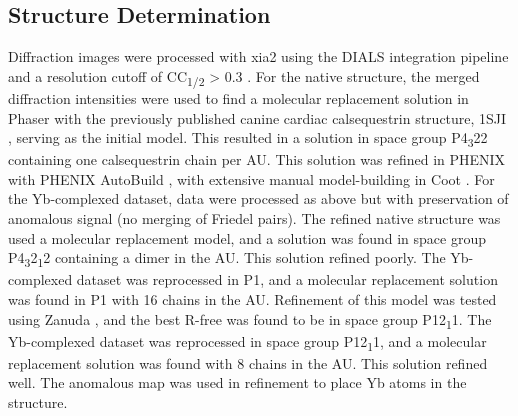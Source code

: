 \subsection*{Structure Determination}
Diffraction images were processed with xia2 using the DIALS integration pipeline and a resolution cutoff of CC\textsubscript{1/2} > 0.3 \supercite{Winter2018-oa,Winter2010-tx,Evans2013-wu,Evans2006-cc,Winn2011-fi}. For the native structure, the merged diffraction intensities were used to find a molecular replacement solution in Phaser \supercite{McCoy2007-rr} with the previously published canine cardiac calsequestrin structure, 1SJI \supercite{Park2004-bu}, serving as the initial model. This resulted in a solution in space group P4\textsubscript{3}22 containing one calsequestrin chain per AU. This solution was refined in PHENIX \supercite{Adams2010-qs} with PHENIX AutoBuild \supercite{Adams2010-qs,Afonine2012-xn,Terwilliger2004-hs,Terwilliger2008-zf,Zwart2005-kc}, with extensive manual model-building in Coot \supercite{Emsley2010-il}. For the Yb-complexed dataset, data were processed as above but with preservation of anomalous signal (no merging of Friedel pairs). The refined native structure was used a molecular replacement model, and a solution was found in space group P4\textsubscript{3}2\textsubscript{1}2 containing a dimer in the AU. This solution refined poorly. The Yb-complexed dataset was reprocessed in P1, and a molecular replacement solution was found in P1 with 16 chains in the AU. Refinement of this model was tested using Zanuda \supercite{Lebedev2014-po}, and the best R-free was found to be in space group P12\textsubscript{1}1. The Yb-complexed dataset was reprocessed in space group P12\textsubscript{1}1, and a molecular replacement solution was found with 8 chains in the AU. This solution refined well. The anomalous map was used in refinement to place Yb atoms in the structure.


